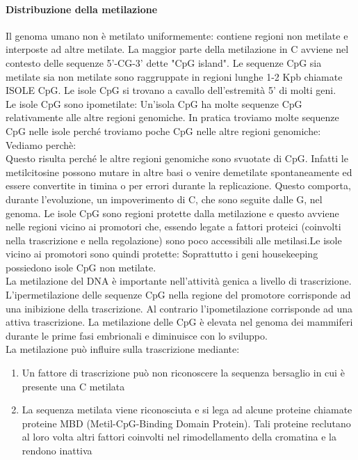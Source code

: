 \documentclass{article}
\begin{document}
\paragraph{Distribuzione della metilazione}
Il genoma umano non è metilato uniformemente: contiene regioni non metilate e interposte ad altre metilate.
La maggior parte della metilazione in C avviene nel contesto delle sequenze 5'-CG-3' dette "CpG island".
Le sequenze CpG sia metilate sia non metilate sono raggruppate in regioni lunghe 1-2 Kpb chiamate ISOLE CpG. Le isole CpG si trovano a cavallo dell'estremità 5' di molti geni.\\
Le isole CpG sono ipometilate: Un'isola CpG ha molte sequenze CpG relativamente alle altre regioni genomiche. 
In pratica troviamo molte sequenze CpG nelle isole perché troviamo poche CpG nelle altre regioni genomiche:
Vediamo perchè:\\
Questo risulta perché le altre regioni genomiche sono svuotate di CpG. Infatti le metilcitosine possono mutare in altre basi o venire demetilate spontaneamente ed essere
convertite in timina o per errori durante la replicazione. Questo comporta, durante l'evoluzione,
un impoverimento di C, che sono seguite dalle G, nel genoma. Le isole CpG sono regioni protette dalla metilazione e questo avviene nelle regioni vicino ai
promotori che, essendo legate a fattori proteici (coinvolti nella trascrizione e nella regolazione)
sono poco accessibili alle metilasi.Le isole vicino ai promotori sono quindi protette:
Soprattutto i geni housekeeping possiedono isole CpG non metilate.\\
La metilazione del DNA è importante nell'attività genica a livello di trascrizione. L'ipermetilazione delle sequenze CpG nella regione del promotore corrisponde ad una
inibizione della trascrizione. Al contrario l'ipometilazione corrisponde ad una attiva trascrizione. La metilazione delle CpG è elevata nel genoma
dei mammiferi durante le prime fasi embrionali e diminuisce con lo sviluppo.\\
La metilazione può influire sulla trascrizione mediante:
\begin{enumerate}
    \item Un fattore di trascrizione può non riconoscere la sequenza bersaglio in
    cui è presente una C metilata
    \item La sequenza metilata viene riconosciuta e si lega ad alcune proteine
    chiamate proteine MBD (Metil-CpG-Binding Domain Protein). Tali
    proteine reclutano al loro volta altri fattori coinvolti nel rimodellamento
    della cromatina e la rendono inattiva
\end{enumerate}
\end{document}
